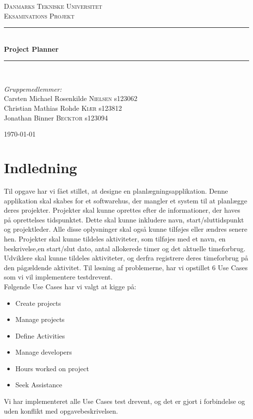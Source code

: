 \documentclass[a4paper,12pt]{article}
\title{
\HRule \\
\textsc{\doctitle} \\
	 \small{\textsl{\docsubtitle}}
\HRule
}
\author{\docauthor\\\small{\docplace}}
\date{\docdate}
\newcommand{\HRule}{\rule{\linewidth}{0.5mm}}
\begin{document}
\begin{titlepage}
\begin{center}
\textsc{\LARGE Danmarks Tekniske Universitet}\\[1.5cm]
\textsc{\large Eksaminations Projekt}\\[0.5cm]
\HRule \\[0.4cm]
{ \huge \bfseries Project Planner}\\[0.1cm]
\HRule \\[1.5cm]
\end{center}
\begin{flushleft} \large
\emph{Gruppemedlemmer:}\\
Carsten Michael Rosenkilde \textsc{Nielsen} s123062\\
Christian Mathias Rohde \textsc{Kiær} s123812\\
Jonathan Binner \textsc{Becktor} s123094\\
\end{flushleft}
\vfill 
\begin{center}
{\large \today}
\end{center}
\end{titlepage}
\section*{Indledning}
Til opgave har vi fået stillet, at designe en planlægningsapplikation. Denne applikation skal skabes for et softwarehus, der mangler et system til at planlægge deres projekter. Projekter skal kunne oprettes efter de informationer, der haves på oprettelses tidspunktet. Dette skal kunne inkludere navn, start/sluttidspunkt og projektleder. Alle disse oplysninger skal også kunne tilføjes eller ændres senere hen. Projekter skal kunne tildeles aktiviteter, som tilføjes med et navn, en beskrivelse,en start/slut dato, antal  allokerede timer og det aktuelle timeforbrug. Udviklere skal kunne tildeles aktiviteter, og derfra registrere deres timeforbrug på den pågældende aktivitet. Til løsning af problemerne, har vi opstillet 6 Use Cases som vi vil implementere testdrevent.  \\
Følgende Use Cases har vi valgt at kigge på: 
\begin{itemize}
\item Create projects
\item Manage projects
\item Define Activities
\item Manage developers
\item Hours worked on project
\item Seek Assistance
\end{itemize}
Vi har implementeret alle Use Cases test drevent, og det er gjort i forbindelse og uden konflikt med opgavebeskrivelsen.
\newpage
\tableofcontents
\newpage
\end{document}
